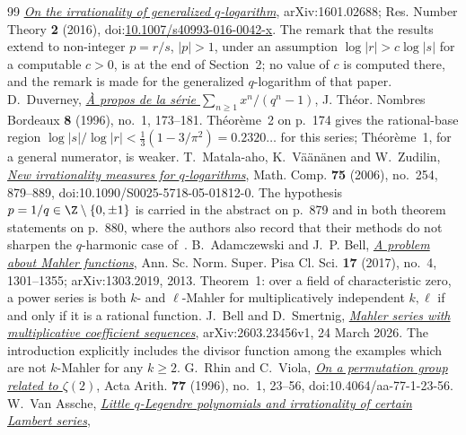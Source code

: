 \documentclass[11pt]{article}
\begin{document}
\begin{thebibliography}{99}
  \href{https://arxiv.org/abs/1601.02688}{\emph{On the irrationality of
  generalized \(q\)-logarithm}}, arXiv:1601.02688; Res. Number Theory
  \textbf{2} (2016),
  doi:\href{https://doi.org/10.1007/s40993-016-0042-x}{10.1007/s40993-016-0042-x}.
  The remark that the results extend to non-integer \(p=r/s\), \(|p|>1\), under
  an assumption \(\log|r|>c\log|s|\) for a computable \(c>0\), is at the end of
  Section~2; no value of \(c\) is computed there, and the remark is made for the
  generalized \(q\)-logarithm of that paper.
 D.~Duverney,
  \href{https://numdam.org/item/JTNB_1996__8_1_173_0.pdf}{\emph{\`A propos de la
  s\'erie $\sum_{n\ge1}x^{n}/(q^{n}-1)$}},
  J. Th\'eor. Nombres Bordeaux \textbf{8} (1996), no.~1, 173--181.
  Th\'eor\`eme~2 on p.~174 gives the rational-base region
  $\log|s|/\log|r|<\frac13(1-3/\pi^{2})=0.2320\ldots$ for this series;
  Th\'eor\`eme~1, for a general numerator, is weaker.
 T.~Matala-aho, K.~V\"a\"an\"anen and W.~Zudilin,
  \href{https://doi.org/10.1090/S0025-5718-05-01812-0}{\emph{New irrationality
  measures for \(q\)-logarithms}}, Math. Comp. \textbf{75} (2006), no.~254,
  879--889, doi:10.1090/S0025-5718-05-01812-0.  The hypothesis
  \(p=1/q\in\Z\mathbin{\backslash}\{0,\pm1\}\) is carried in the abstract on p.~879 and in
  both theorem statements on p.~880, where the authors also record that their
  methods do not sharpen the \(q\)-harmonic case of~\cite{zudilin2004}.
 B.~Adamczewski and J.~P. Bell,
  \href{https://arxiv.org/abs/1303.2019}{\emph{A problem about Mahler
  functions}}, Ann. Sc. Norm. Super. Pisa Cl. Sci. \textbf{17} (2017), no.~4,
  1301--1355; arXiv:1303.2019, 2013.  Theorem~1: over a field of characteristic
  zero, a power series is both \(k\)- and \(\ell\)-Mahler for multiplicatively
  independent \(k,\ell\) if and only if it is a rational function.
 J.~Bell and D.~Smertnig,
  \href{https://arxiv.org/abs/2603.23456}{\emph{Mahler series with
  multiplicative coefficient sequences}}, arXiv:2603.23456v1,
  24 March 2026.  The introduction explicitly includes the divisor function
  among the examples which are not \(k\)-Mahler for any \(k\ge2\).
 G.~Rhin and C.~Viola,
  \href{https://geodesic.mathdoc.fr/articles/10.4064/aa-77-1-23-56/}
  {\emph{On a permutation group related to $\zeta(2)$}},
  Acta Arith. \textbf{77} (1996), no.~1, 23--56,
  doi:10.4064/aa-77-1-23-56.
 W.~Van Assche,
  \href{https://arxiv.org/abs/math/0101187}{\emph{Little \(q\)-Legendre
  polynomials and irrationality of certain Lambert series}},

\end{thebibliography}
\end{document}
